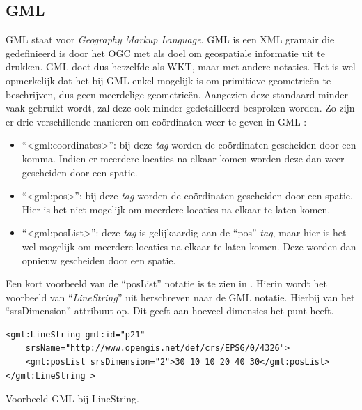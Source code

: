 \subsection{GML}
GML staat voor \textit{Geography Markup Language}. GML is een XML gramair die gedefinieerd is door het OGC met als doel om geospatiale informatie uit te drukken. GML doet dus hetzelfde als WKT, maar met andere notaties. Het is wel opmerkelijk dat het bij GML enkel mogelijk is om primitieve geometrieën te beschrijven, dus geen meerdelige geometrieën. Aangezien deze standaard minder vaak gebruikt wordt, zal deze ook minder gedetailleerd besproken worden. Zo zijn er drie verschillende manieren om coördinaten weer te geven in GML \cite{ogcdocs}:
\begin{itemize}
    \item ``<gml:coordinates>'': bij deze \textit{tag} worden de coördinaten gescheiden door een komma. Indien er meerdere locaties na elkaar komen worden deze dan weer gescheiden door een spatie.
    \item ``<gml:pos>'': bij deze \textit{tag} worden de coördinaten gescheiden door een spatie. Hier is het niet mogelijk om meerdere locaties na elkaar te laten komen.
    \item ``<gml:posList>'': deze \textit{tag} is gelijkaardig aan de ``pos'' \textit{tag}, maar hier is het wel mogelijk om meerdere locaties na elkaar te laten komen. Deze worden dan opnieuw gescheiden door een spatie.
\end{itemize}

Een kort voorbeeld van de ``posList'' notatie is te zien in . Hierin wordt het voorbeeld van ``\textit{LineString}'' uit  herschreven naar de GML notatie. Hierbij van het ``srsDimension'' attribuut op. Dit geeft aan hoeveel dimensies het punt heeft.

\begin{listing}[ht]
\begin{verbatim}
<gml:LineString gml:id="p21"
    srsName="http://www.opengis.net/def/crs/EPSG/0/4326">
    <gml:posList srsDimension="2">30 10 10 20 40 30</gml:posList>
</gml:LineString >
\end{verbatim}
\caption{Voorbeeld GML bij LineString.}
\label{listing:gml}
\end{listing}

